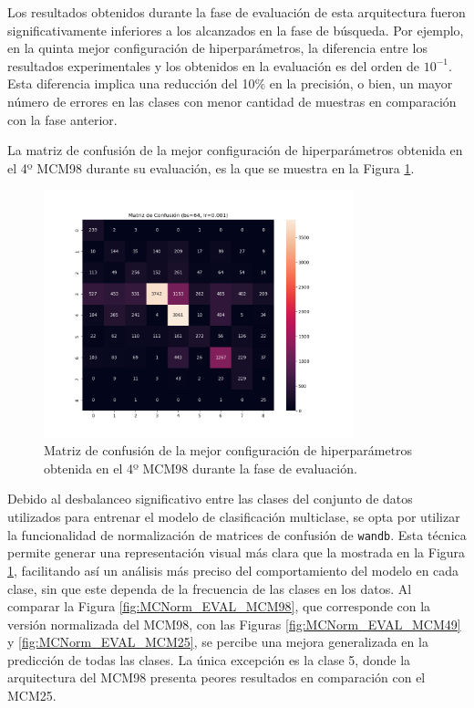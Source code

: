 Los resultados obtenidos durante la fase de evaluación de esta arquitectura fueron significativamente inferiores a los alcanzados en la fase de búsqueda. Por ejemplo, en la quinta mejor configuración de hiperparámetros, la diferencia entre los resultados experimentales y los obtenidos en la evaluación es del orden de $10^{-1}$. Esta diferencia implica una reducción del 10\% en la precisión, o bien, un mayor número de errores en las clases con menor cantidad de muestras en comparación con la fase anterior.


La matriz de confusión de la mejor configuración de hiperparámetros obtenida en el 4º MCM98 durante su evaluación, es la que se muestra en la Figura \ref{fig:MC_EVAL_MCM98}.

\begin{figure}[H]
    \centering
    \includegraphics[width=0.8\textwidth]{./img/evaluacion/matrices_confusion/MC_EVAL_MCM98.png}
    \caption{Matriz de confusión de la mejor configuración de hiperparámetros obtenida en el 4º MCM98 durante la fase de evaluación.}
    \label{fig:MC_EVAL_MCM98}
\end{figure}

Debido al desbalanceo significativo entre las clases del conjunto de datos utilizados para entrenar el modelo de clasificación multiclase, se opta por utilizar la funcionalidad de normalización de matrices de confusión de \texttt{wandb}. Esta técnica permite generar una representación visual más clara que la mostrada en la Figura \ref{fig:MC_EVAL_MCM98}, facilitando así un análisis más preciso del comportamiento del modelo en cada clase, sin que este dependa de la frecuencia de las clases en los datos. Al comparar la Figura \ref{fig:MCNorm_EVAL_MCM98}, que corresponde con la versión normalizada del MCM98,  con las Figuras \ref{fig:MCNorm_EVAL_MCM49} y \ref{fig:MCNorm_EVAL_MCM25}, se percibe una mejora generalizada en la predicción de todas las clases. La única excepción es la clase 5, donde la arquitectura del MCM98 presenta peores resultados en comparación con el MCM25.

